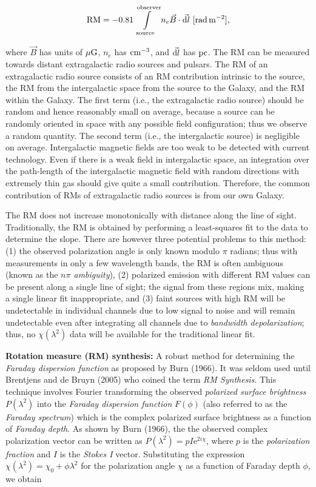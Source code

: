 \documentclass[a4paper,10pt]{article}
\begin{document}
\begin{align*}
	\mathrm{RM} = -0.81 \int\limits_\mathrm{source}^\mathrm{observer} n_e \vec{B}\cdot\vec{{\rm d}l} ~ [{\rm rad\,m^{-2}}],
\end{align*}

{\noindent}where $\vec{B}$ has units of $\mu{\rm G}$, $n_e$ has ${\rm cm^{-3}}$, and $\vec{{\rm d}l}$ has ${\rm pc}$. The RM can be measured towards distant extragalactic radio sources and pulsars. The RM of an extragalactic radio source consists of an RM contribution intrinsic to the source, the RM from the intergalactic space from the source to the Galaxy, and the RM within the Galaxy. The first term (i.e., the extragalactic radio source) should be random and hence reasonably small on average, because a source can be randomly oriented in space with any possible field configuration; thus we observe a random quantity. The second term (i.e., the intergalactic source) is negligible on average. Intergalactic magnetic fields are too weak to be detected with current technology. Even if there is a weak field in intergalactic space, an integration over the path-length of the intergalactic magnetic field with random directions with extremely thin gas should give quite a small contribution. Therefore, the common contribution of RMs of extragalactic radio sources is from our own Galaxy. 

{\noindent}The RM does not increase monotonically with distance along the line of sight. Traditionally, the RM is obtained by performing a least-squares fit to the data to determine the slope. There are however three potential problems to this method: (1) the observed polarization angle is only known modulo $\pi$ radians; thus with measurements in only a few wavelength bands, the RM is often ambiguous (known as the \textit{$n\pi$ ambiguity}), (2) polarized emission with different RM values can be present along a single line of sight; the signal from these regions mix, making a single linear fit inappropriate, and (3) faint sources with high RM will be undetectable in individual channels due to low signal to noise and will remain undetectable even after integrating all channels due to \textit{bandwidth depolarization}; thus, no $\chi(\lambda^2)$ data will be available for the traditional linear fit.

{\noindent}\textbf{Rotation measure (RM) synthesis:} A robust method for determining the \textit{Faraday dispersion function} as proposed by Burn (1966). It was seldom used until Brentjens and de Bruyn (2005) who coined the term \textit{RM Synthesis}. This technique involves Fourier transforming the observed \textit{polarized surface brightness} $P(\lambda^2)$ into the \textit{Faraday dispersion function} $F(\phi)$ (also referred to as the \textit{Faraday spectrum}) which is the complex polarized surface brightness as a function of \textit{Faraday depth}. As shown by Burn (1966), the the observed complex polarization vector can be written as $P(\lambda^2)=pI\mathrm{e}^{2i\chi}$, where $p$ is the \textit{polarization fraction} and $I$ is the \textit{Stokes I} vector. Substituting the expression $\chi(\lambda^2)=\chi_0+\phi\lambda^2$ for the polarization angle $\chi$ as a function of Faraday depth $\phi$, we obtain
\end{document}
